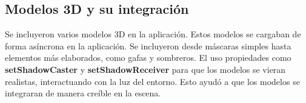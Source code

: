 \documentclass[conference]{IEEEtran}
\begin{document}
    \subsection{Modelos 3D y su integración}
        Se incluyeron varios modelos 3D en la aplicación. Estos modelos se cargaban de forma asíncrona en la aplicación. Se incluyeron desde máscaras simples hasta elementos más elaborados, como gafas y sombreros. El uso propiedades como \textbf{setShadowCaster} y \textbf{setShadowReceiver} para que los modelos se vieran realistas, interactuando con la luz del entorno. Esto ayudó a que los modelos se integraran de manera creíble en la escena.
       \begin{figure}[h!]
            \centering
            \quad
\end{figure}
\end{document}
